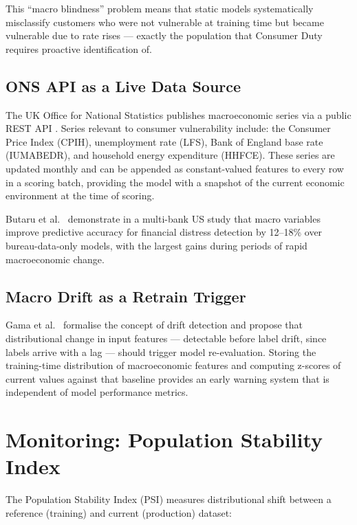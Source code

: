 \documentclass[12pt, a4paper]{article}
\begin{document}
This ``macro blindness'' problem means that static models systematically
misclassify customers who were not vulnerable at training time but became
vulnerable due to rate rises --- exactly the population that Consumer Duty
requires proactive identification of.

\subsection{ONS API as a Live Data Source}

The UK Office for National Statistics publishes macroeconomic series via a
public REST API \cite{ons2024api}.
Series relevant to consumer vulnerability include: the Consumer Price Index
(CPIH), unemployment rate (LFS), Bank of England base rate (IUMABEDR), and
household energy expenditure (HHFCE).
These series are updated monthly and can be appended as constant-valued features
to every row in a scoring batch, providing the model with a snapshot of the
current economic environment at the time of scoring.

Butaru et al.\ \cite{butaru2016} demonstrate in a multi-bank US study that macro
variables improve predictive accuracy for financial distress detection by 12--18\%
over bureau-data-only models, with the largest gains during periods of rapid
macroeconomic change.

\subsection{Macro Drift as a Retrain Trigger}

Gama et al.\ \cite{gama2014} formalise the concept of drift detection and propose
that distributional change in input features --- detectable before label drift,
since labels arrive with a lag --- should trigger model re-evaluation.
Storing the training-time distribution of macroeconomic features and computing
z-scores of current values against that baseline provides an early warning system
that is independent of model performance metrics.

\section{Monitoring: Population Stability Index}

The Population Stability Index (PSI) \cite{yurdakul2018} measures distributional
shift between a reference (training) and current (production) dataset:
\end{document}

